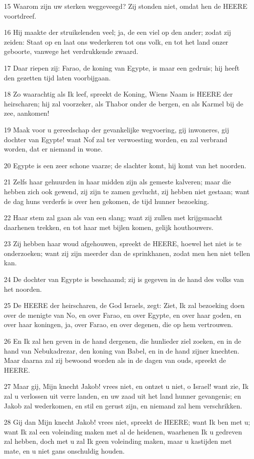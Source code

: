 \par 15 Waarom zijn uw sterken weggeveegd? Zij stonden niet, omdat hen de HEERE voortdreef.
\par 16 Hij maakte der struikelenden veel; ja, de een viel op den ander; zodat zij zeiden: Staat op en laat ons wederkeren tot ons volk, en tot het land onzer geboorte, vanwege het verdrukkende zwaard.
\par 17 Daar riepen zij: Farao, de koning van Egypte, is maar een gedruis; hij heeft den gezetten tijd laten voorbijgaan.
\par 18 Zo waarachtig als Ik leef, spreekt de Koning, Wiens Naam is HEERE der heirscharen; hij zal voorzeker, als Thabor onder de bergen, en als Karmel bij de zee, aankomen!
\par 19 Maak voor u gereedschap der gevankelijke wegvoering, gij inwoneres, gij dochter van Egypte! want Nof zal ter verwoesting worden, en zal verbrand worden, dat er niemand in wone.
\par 20 Egypte is een zeer schone vaarze; de slachter komt, hij komt van het noorden.
\par 21 Zelfs haar gehuurden in haar midden zijn als gemeste kalveren; maar die hebben zich ook gewend, zij zijn te zamen gevlucht, zij hebben niet gestaan; want de dag huns verderfs is over hen gekomen, de tijd hunner bezoeking.
\par 22 Haar stem zal gaan als van een slang; want zij zullen met krijgsmacht daarhenen trekken, en tot haar met bijlen komen, gelijk houthouwers.
\par 23 Zij hebben haar woud afgehouwen, spreekt de HEERE, hoewel het niet is te onderzoeken; want zij zijn meerder dan de sprinkhanen, zodat men hen niet tellen kan.
\par 24 De dochter van Egypte is beschaamd; zij is gegeven in de hand des volks van het noorden.
\par 25 De HEERE der heirscharen, de God Israels, zegt: Ziet, Ik zal bezoeking doen over de menigte van No, en over Farao, en over Egypte, en over haar goden, en over haar koningen, ja, over Farao, en over degenen, die op hem vertrouwen.
\par 26 En Ik zal hen geven in de hand dergenen, die hunlieder ziel zoeken, en in de hand van Nebukadrezar, den koning van Babel, en in de hand zijner knechten. Maar daarna zal zij bewoond worden als in de dagen van ouds, spreekt de HEERE.
\par 27 Maar gij, Mijn knecht Jakob! vrees niet, en ontzet u niet, o Israel! want zie, Ik zal u verlossen uit verre landen, en uw zaad uit het land hunner gevangenis; en Jakob zal wederkomen, en stil en gerust zijn, en niemand zal hem verschrikken.
\par 28 Gij dan Mijn knecht Jakob! vrees niet, spreekt de HEERE; want Ik ben met u; want Ik zal een voleinding maken met al de heidenen, waarhenen Ik u gedreven zal hebben, doch met u zal Ik geen voleinding maken, maar u kastijden met mate, en u niet gans onschuldig houden.

